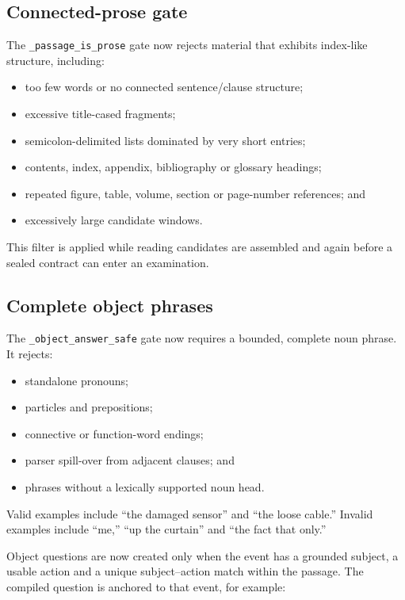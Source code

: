 \documentclass[11pt,a4paper]{article}
\begin{document}
\subsection{Connected-prose gate}

The \texttt{\_passage\_is\_prose} gate now rejects material that exhibits index-like structure,
including:

\begin{itemize}
  \item too few words or no connected sentence/clause structure;
  \item excessive title-cased fragments;
  \item semicolon-delimited lists dominated by very short entries;
  \item contents, index, appendix, bibliography or glossary headings;
  \item repeated figure, table, volume, section or page-number references; and
  \item excessively large candidate windows.
\end{itemize}

This filter is applied while reading candidates are assembled and again before a sealed contract
can enter an examination.

\subsection{Complete object phrases}

The \texttt{\_object\_answer\_safe} gate now requires a bounded, complete noun phrase.  It rejects:

\begin{itemize}
  \item standalone pronouns;
  \item particles and prepositions;
  \item connective or function-word endings;
  \item parser spill-over from adjacent clauses; and
  \item phrases without a lexically supported noun head.
\end{itemize}

Valid examples include ``the damaged sensor'' and ``the loose cable.''  Invalid examples include
``me,'' ``up the curtain'' and ``the fact that only.''

Object questions are now created only when the event has a grounded subject, a usable action and
a unique subject--action match within the passage.  The compiled question is anchored to that
event, for example:
\end{document}
